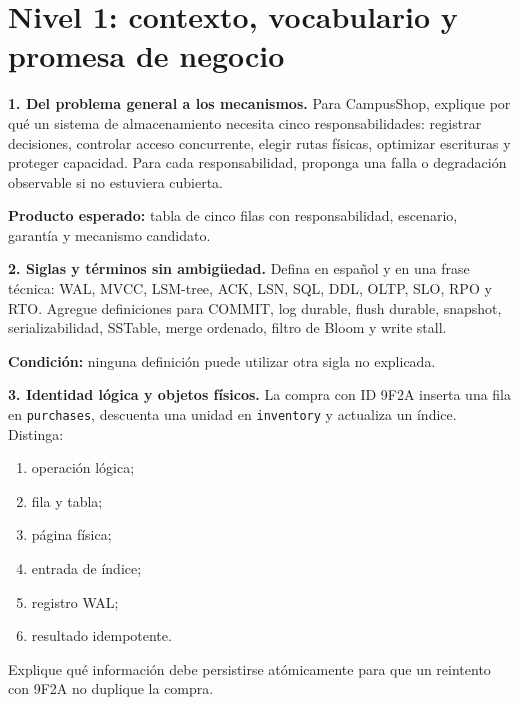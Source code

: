 \documentclass[variant=guia,cover=institutional,mode=screen]{ua-engineering-v6-article}
\begin{document}
\section{Nivel 1: contexto, vocabulario y promesa de negocio}

\begin{uaexercise}
\textbf{1. Del problema general a los mecanismos.} Para CampusShop, explique por qué un sistema de almacenamiento necesita cinco responsabilidades: registrar decisiones, controlar acceso concurrente, elegir rutas físicas, optimizar escrituras y proteger capacidad. Para cada responsabilidad, proponga una falla o degradación observable si no estuviera cubierta.

\textbf{Producto esperado:} tabla de cinco filas con responsabilidad, escenario, garantía y mecanismo candidato.
\end{uaexercise}

\begin{uaexercise}
\textbf{2. Siglas y términos sin ambigüedad.} Defina en español y en una frase técnica: WAL, MVCC, LSM-tree, ACK, LSN, SQL, DDL, OLTP, SLO, RPO y RTO. Agregue definiciones para COMMIT, log durable, flush durable, snapshot, serializabilidad, SSTable, merge ordenado, filtro de Bloom y write stall.

\textbf{Condición:} ninguna definición puede utilizar otra sigla no explicada.
\end{uaexercise}

\begin{uaexercise}
\textbf{3. Identidad lógica y objetos físicos.} La compra con ID 9F2A inserta una fila en \texttt{purchases}, descuenta una unidad en \texttt{inventory} y actualiza un índice. Distinga:

\begin{enumerate}
\item operación lógica;
\item fila y tabla;
\item página física;
\item entrada de índice;
\item registro WAL;
\item resultado idempotente.
\end{enumerate}

Explique qué información debe persistirse atómicamente para que un reintento con 9F2A no duplique la compra.
\end{uaexercise}
\end{document}
